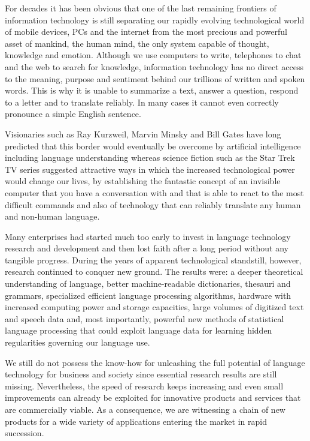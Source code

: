 \documentclass[10pt, plain]{../../metanetpaper}
\begin{document}
\begin{multicols}{2}
For decades it has been obvious that one of the last remaining frontiers of information technology is still
separating our rapidly evolving technological world of mobile devices, PCs and the internet from the most precious and powerful asset of mankind, the human mind, the only system capable of thought, knowledge and emotion. Although we use computers to write, telephones to chat and the web to search for knowledge, information technology has no direct access to the meaning, purpose and sentiment behind our trillions of written and spoken words. This is why it is unable to summarize a text, answer a question, respond to a letter and to translate reliably. In many cases it cannot even correctly pronounce a simple English sentence.

Visionaries such as Ray Kurzweil, Marvin Minsky and Bill Gates have long predicted that this border would eventually be overcome by artificial intelligence including language understanding whereas science fiction such as the Star Trek TV series suggested attractive ways in which the increased technological power would change our lives, by establishing the fantastic concept of an invisible computer that you have a conversation with and that is able to react to the most difficult commands and also of technology that can reliably translate any human and non-human language.

Many enterprises had started much too early to invest in language technology research and development and then lost faith after a long period without any tangible progress. During the years of apparent technological standstill, however, research continued to conquer new ground. The results were: a deeper theoretical understanding of language, better machine-readable dictionaries, thesauri and grammars, specialized efficient language processing algorithms, hardware with increased computing power and storage capacities, large volumes of digitized text and speech data and, most importantly, powerful new methods of statistical language processing that could exploit language data for learning hidden regularities governing our language use.

We still do not possess the know-how for unleashing the full potential of language technology for business and society since essential research results are still missing. Nevertheless, the speed of research keeps increasing and even small improvements can already be exploited for innovative products and services that are commercially viable. As a consequence, we are witnessing a chain of new products for a wide variety of applications entering the market in rapid succession.


\end{multicols}
\end{document}
